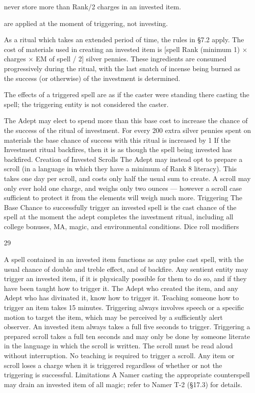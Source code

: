 \documentclass[a4paper]{article}
\begin{document}
\begin{multicols}{3}
never store more than Rank/2 charges in an invested item.

are applied at the moment of triggering, not investing.

As a ritual which takes an extended period of time,
the rules in §7.2 apply. The cost of materials used
in creating an invested item is [spell Rank (minimum 1) × charges × EM of spell / 2] silver pennies. These ingredients are consumed progressively
during the ritual, with the last snatch of incense
being burned as the success (or otherwise) of the
investment is determined.

The effects of a triggered spell are as if the caster
were standing there casting the spell; the triggering
entity is not considered the caster.

The Adept may elect to spend more than this base
cost to increase the chance of the success of the
ritual of investment. For every 200 extra silver
pennies spent on materials the base chance of
success with this ritual is increased by 1%
If the Investment ritual backfires, then it is as
though the spell being invested has backfired.
Creation of Invested Scrolls The Adept may
instead opt to prepare a scroll (in a language in
which they have a minimum of Rank 8 literacy).
This takes one day per scroll, and costs only half
the usual sum to create. A scroll may only ever
hold one charge, and weighs only two ounces —
however a scroll case sufficient to protect it from
the elements will weigh much more.
Triggering The Base Chance to successfully trigger an invested spell is the cast chance of the spell
at the moment the adept completes the investment
ritual, including all college bonuses, MA, magic,
and environmental conditions. Dice roll modifiers

29

A spell contained in an invested item functions as
any pulse cast spell, with the usual chance of double and treble effect, and of backfire. Any sentient
entity may trigger an invested item, if it is physically possible for them to do so, and if they have
been taught how to trigger it. The Adept who created the item, and any Adept who has divinated it,
know how to trigger it. Teaching someone how to
trigger an item takes 15 minutes.
Triggering always involves speech or a specific
motion to target the item, which may be perceived
by a sufficiently alert observer. An invested item
always takes a full five seconds to trigger.
Triggering a prepared scroll takes a full ten seconds and may only be done by someone literate in
the language in which the scroll is written. The
scroll must be read aloud without interruption. No
teaching is required to trigger a scroll.
Any item or scroll loses a charge when it is triggered regardless of whether or not the triggering is
successful.
Limitations A Namer casting the appropriate
counterspell may drain an invested item of all
magic; refer to Namer T-2 (§17.3) for details.


\end{multicols}
\end{document}
